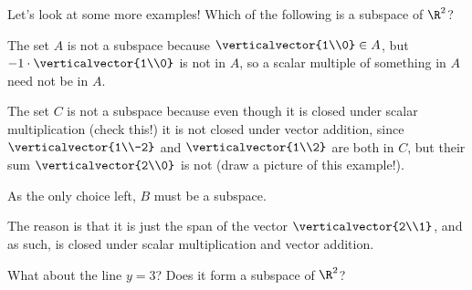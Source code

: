 \documentclass{ximera}
\begin{document}
\begin{question}
  Let's look at some more examples!  Which of the following is a subspace of $\R^2$?
  \begin{solution}
    \begin{hint}
      The set $A$ is not a subspace because $\verticalvector{1\\0} \in A$, but $-1 \cdot \verticalvector{1\\0}$ is not in $A$, so a scalar multiple of something in $A$ need not be in $A$.
    \end{hint}
    \begin{hint}
      The set $C$ is not a subspace because even though it is closed
      under scalar multiplication (check this!) it is not closed under
      vector addition, since $\verticalvector{1\\-2}$ and
      $\verticalvector{1\\2}$ are both in $C$, but their sum
      $\verticalvector{2\\0}$ is not (draw a picture of this
      example!).
    \end{hint}
    \begin{hint}
      As the only choice left, $B$ must be a subspace.

      The reason is that it is just the span of the vector
      $\verticalvector{2\\1}$, and as such, is closed under scalar
      multiplication and vector addition.
    \end{hint}
    \begin{multiple-choice}
    \end{multiple-choice}
  \end{solution}


  \begin{solution}
    \begin{hint}
      \begin{question}
        What about the line $y = 3$?  Does it form a subspace of $\R^2$?
        
        \begin{solution}
          \begin{multiple-choice}
          \end{multiple-choice}
        \end{solution}


\end{question}
\end{hint}
\end{solution}
\end{question}
\end{document}
